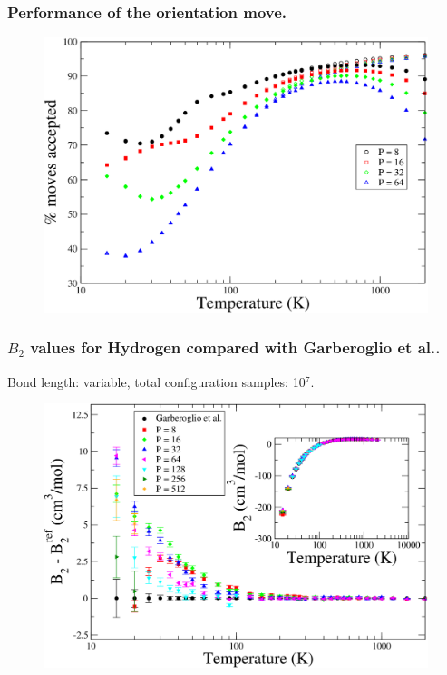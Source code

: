\documentclass[xcolor=svgnames]{beamer}
\begin{document}
            \begin{frame}
                \frametitle{Performance of the orientation move.}
                \begin{figure}
                    \centering
                    \includegraphics[scale=0.18,keepaspectratio]{s12orAcc.png}
                \end{figure}
            \end{frame}
            \begin{frame}
                \frametitle{$B_2$ values for Hydrogen compared with Garberoglio et al..}
                \begin{center}Bond length: variable, total configuration samples: 10$^7$.\end{center}
                \begin{figure}
                    \centering
                    \includegraphics[scale=0.18,keepaspectratio]{s3GarberoglioAll.png}
                \end{figure}
            \end{frame}
\end{document}
